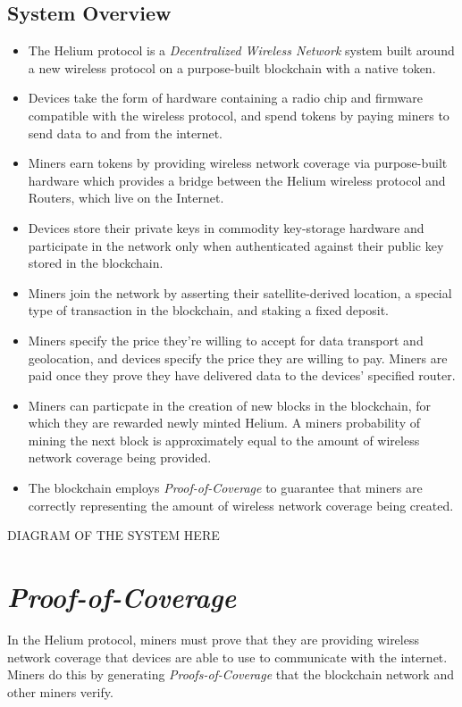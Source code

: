 \documentclass[letterpaper,11pt]{article}
\def\proofofcoverage/{\textit{Proof-of-Coverage}}
\begin{document}
\subsection{System Overview}

\begin{itemize}
	\item The Helium protocol is a \textit{Decentralized Wireless Network} system built around a new wireless protocol on a purpose-built blockchain with a native token. 
	\item Devices take the form of hardware containing a radio chip and firmware compatible with the wireless protocol, and spend tokens by paying miners to send data to and from the internet. 
	\item Miners earn tokens by providing wireless network coverage via purpose-built hardware which provides a bridge between the Helium wireless protocol and Routers, which live on the Internet.
	\item Devices store their private keys in commodity key-storage hardware and participate in the network only when authenticated against their public key stored in the blockchain.
	\item Miners join the network by asserting their satellite-derived location, a special type of transaction in the blockchain, and staking a fixed deposit.
	\item Miners specify the price they're willing to accept for data transport and geolocation, and devices specify the price they are willing to pay. Miners are paid once they prove they have delivered data to the devices' specified router.
	\item Miners can particpate in the creation of new blocks in the blockchain, for which they are rewarded newly minted Helium. A miners probability of mining the next block is approximately equal to the amount of wireless network coverage being provided.
	\item The blockchain employs \proofofcoverage/ to guarantee that miners are correctly representing the amount of wireless network coverage being created.
\end{itemize}

DIAGRAM OF THE SYSTEM HERE

\section{\proofofcoverage/}

In the Helium protocol, miners must prove that they are providing wireless network coverage that devices are able to use to communicate with the internet. Miners do this by generating \textit{Proofs-of-Coverage} that the blockchain network and other miners verify.\newline
\end{document}
